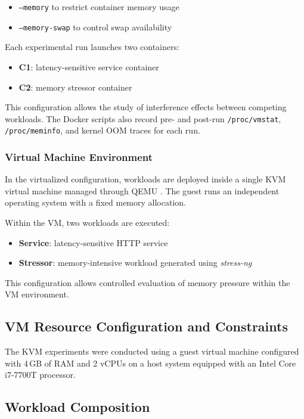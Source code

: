 \documentclass[conference]{IEEEtran}
\begin{document}
\begin{itemize}
\item \texttt{--memory} to restrict container memory usage
\item \texttt{--memory-swap} to control swap availability
\end{itemize}

Each experimental run launches two containers:

\begin{itemize}
\item \textbf{C1}: latency-sensitive service container
\item \textbf{C2}: memory stressor container
\end{itemize}
This configuration allows the study of interference effects between competing workloads. The Docker scripts also record pre- and post-run \texttt{/proc/vmstat}, \texttt{/proc/meminfo}, and kernel OOM traces for each run.

\subsubsection{Virtual Machine Environment}

In the virtualized configuration, workloads are deployed inside a single KVM virtual machine managed through QEMU \cite{bellard2005qemu}. The guest runs an independent operating system with a fixed memory allocation.

Within the VM, two workloads are executed:

\begin{itemize}
\item \textbf{Service}: latency-sensitive HTTP service
\item \textbf{Stressor}: memory-intensive workload generated using \textit{stress-ng}
\end{itemize}

This configuration allows controlled evaluation of memory pressure within the VM environment.

\subsection{VM Resource Configuration and Constraints}

The KVM experiments were conducted using a guest virtual machine configured with 4\,GB of RAM and 2 vCPUs on a host system equipped with an Intel Core i7-7700T processor. 


\subsection{Workload Composition}
\end{document}
